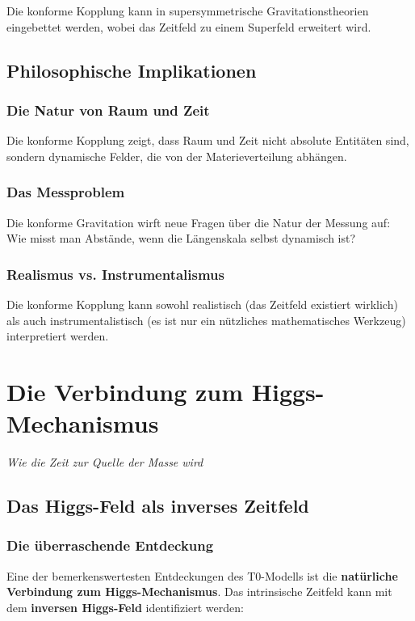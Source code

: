 \documentclass[12pt,a4paper]{report}
\begin{document}
	Die konforme Kopplung kann in supersymmetrische Gravitationstheorien eingebettet werden, wobei das Zeitfeld zu einem Superfeld erweitert wird.
	
	\section{Philosophische Implikationen}
	
	\subsection{Die Natur von Raum und Zeit}
	
	Die konforme Kopplung zeigt, dass Raum und Zeit nicht absolute Entitäten sind, sondern dynamische Felder, die von der Materieverteilung abhängen.
	
	\subsection{Das Messproblem}
	
	Die konforme Gravitation wirft neue Fragen über die Natur der Messung auf: Wie misst man Abstände, wenn die Längenskala selbst dynamisch ist?
	
	\subsection{Realismus vs. Instrumentalismus}
	
	Die konforme Kopplung kann sowohl realistisch (das Zeitfeld existiert wirklich) als auch instrumentalistisch (es ist nur ein nützliches mathematisches Werkzeug) interpretiert werden.
	\chapter{Die Verbindung zum Higgs-Mechanismus}
\textit{Wie die Zeit zur Quelle der Masse wird}

\section{Das Higgs-Feld als inverses Zeitfeld}

\subsection{Die überraschende Entdeckung}

Eine der bemerkenswertesten Entdeckungen des T0-Modells ist die \textbf{natürliche Verbindung zum Higgs-Mechanismus}. Das intrinsische Zeitfeld kann mit dem \textbf{inversen Higgs-Feld} identifiziert werden:
\end{document}
